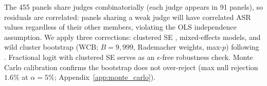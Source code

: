The 455 panels share judges combinatorially (each judge appears in 91 panels), so residuals are correlated: panels sharing a weak judge will have correlated ASR values regardless of their other members, violating the OLS independence assumption. We apply three corrections: clustered SE \citep[CR1, 3-position max-SE;][]{cameron2015practitioners}, mixed-effects models, and wild cluster bootstrap (WCB; $B{=}9{,}999$, Rademacher weights, max-$p$) following \citet{cameron2008bootstrap}. Fractional logit \citep{papke1996econometric} with clustered SE serves as an $\epsilon$-free robustness check. Monte Carlo calibration confirms the bootstrap does not over-reject (max null rejection $1.6\%$ at $\alpha{=}5\%$; Appendix~\ref{app:monte_carlo}).
